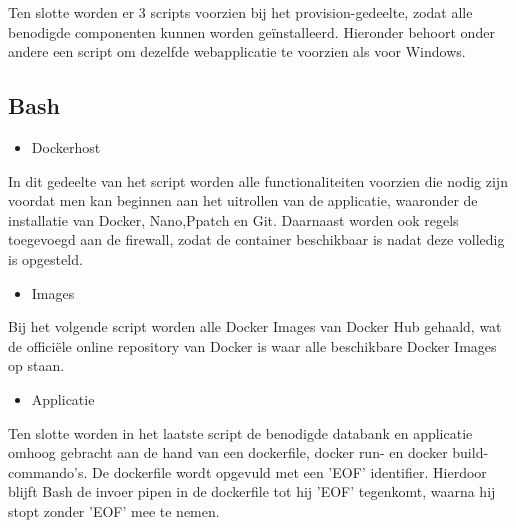 
Ten slotte worden er 3 scripts voorzien bij het provision-gedeelte, zodat alle benodigde componenten kunnen worden geïnstalleerd. Hieronder behoort onder andere een script om dezelfde webapplicatie te voorzien als voor Windows.

\subsection{Bash}

\begin{itemize}[noitemsep]
	\item Dockerhost
\end{itemize}

In dit gedeelte van het script worden alle functionaliteiten voorzien die nodig zijn voordat men kan beginnen aan het uitrollen van de applicatie, waaronder de installatie van Docker, Nano,Ppatch en Git.
Daarnaast worden ook regels toegevoegd aan de firewall, zodat de container beschikbaar is nadat deze volledig is opgesteld.

\begin{itemize}[noitemsep]
	\item Images
\end{itemize}

Bij het volgende script worden alle Docker Images van Docker Hub gehaald, wat de officiële online repository van Docker is waar alle beschikbare Docker Images op staan.

\begin{itemize}[noitemsep]
	\item Applicatie
\end{itemize}

Ten slotte worden in het laatste script de benodigde databank en applicatie omhoog gebracht aan de hand van een dockerfile, docker run- en docker build-commando's.
De dockerfile wordt opgevuld met een 'EOF' identifier. Hierdoor blijft Bash de invoer pipen in de dockerfile tot hij 'EOF' tegenkomt, waarna hij stopt zonder 'EOF' mee te nemen.